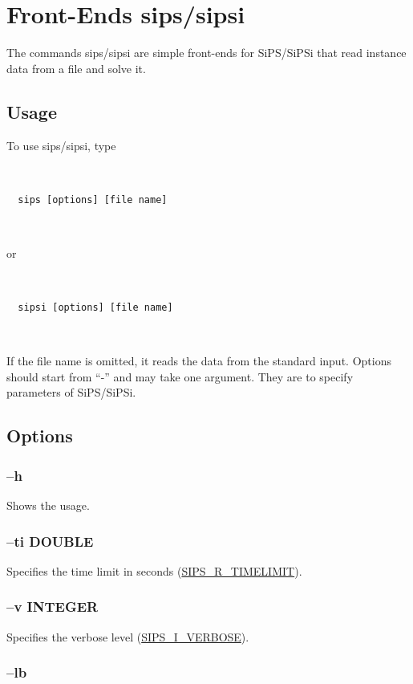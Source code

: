 \documentclass[a4paper]{book}
\newenvironment{xminipage}%
{\begin{center}\begin{Sbox}\begin{minipage}{0.96\textwidth}\mbox{}\\[-15pt]}%
{\mbox{}\\[-21pt]\end{minipage}\end{Sbox}\fbox{\TheSbox}\end{center}}
\begin{document}
\section{Front-Ends sips/sipsi}

The commands sips/sipsi are simple front-ends for SiPS/SiPSi that read instance data from a file and solve it.

\subsection{Usage}

To use sips/sipsi, type
%
\begin{xminipage}
  \begin{verbatim}
  sips [options] [file name]
  \end{verbatim}
\end{xminipage}
%
or
%
\begin{xminipage}
  \begin{verbatim}
  sipsi [options] [file name]
  \end{verbatim}
\end{xminipage}
%
If the file name is omitted, it reads the data from the standard input.
Options should start from ``-'' and may take one argument.
They are to specify parameters of SiPS/SiPSi.

\subsection{Options}

\subsubsection{--h}

Shows the usage.

\subsubsection{--ti DOUBLE}

Specifies the time limit in seconds
(\hyperlink{TIMELIMIT}{SIPS\_R\_TIMELIMIT}).

\subsubsection{--v INTEGER}

Specifies the verbose level
(\hyperlink{VERBOSE}{SIPS\_I\_VERBOSE}).

\subsubsection{--lb}
\end{document}
